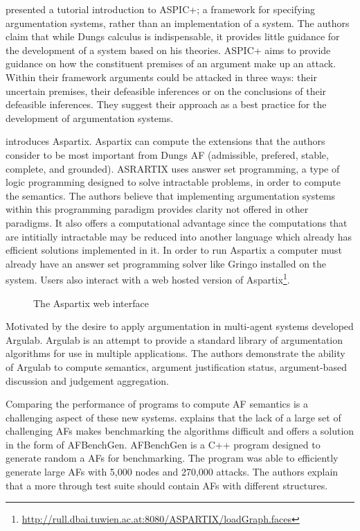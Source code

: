 \cite{modgil2014aspic+} presented a tutorial introduction to ASPIC+; a framework for specifying argumentation systems, rather than an implementation of a system. The authors claim that while Dungs calculus is indispensable, it provides little guidance for the development of a system based on his theories. ASPIC+ aims to provide guidance on how the constituent premises of an argument make up an attack. Within their framework arguments could be attacked in three ways: their uncertain premises, their defeasible inferences or on the conclusions of their defeasible inferences. They suggest their approach as a best practice for the development of argumentation systems.

\cite{egly2008aspartix} introduces Aspartix. Aspartix can compute the extensions that the authors consider to be most important from Dungs AF (admissible, prefered, stable, complete, and grounded). ASRARTIX uses answer set programming, a type of logic programming designed to solve intractable problems, in order to compute the semantics. The authors believe that implementing argumentation systems within this programming paradigm provides clarity not offered in other paradigms. It also offers a computational advantage since the computations that are intitially intractable may be reduced into another language which already has efficient solutions implemented in it. In order to run Aspartix a computer must already have an answer set programming solver like Gringo installed on the system. Users also interact with a web hosted version of Aspartix\footnote{\url{http://rull.dbai.tuwien.ac.at:8080/ASPARTIX/loadGraph.faces}}.

\begin{figure}
    \centering
    \hfill
    \caption{The Aspartix web interface}
    \label{fig:three graphs}
\end{figure}

Motivated by the desire to apply argumentation in multi-agent systems \cite{podlaszewski2011implementation} developed Argulab. Argulab is an attempt to provide a standard library of argumentation algorithms for use in multiple applications. The authors demonstrate the ability of Argulab to compute semantics, argument justification status, argument-based discussion and judgement aggregation.

Comparing the performance of programs to compute AF semantics is a challenging aspect of these new systems. \cite{cerutti2014generating} explains that the lack of a large set of challenging AFs makes benchmarking the algorithms difficult and offers a solution in the form of AFBenchGen.
AFBenchGen is a C++ program designed to generate random a AFs for benchmarking.
The program was able to efficiently generate large AFs with 5,000 nodes and 270,000 attacks.
The authors explain that a more through test suite should contain AFs with different structures.

